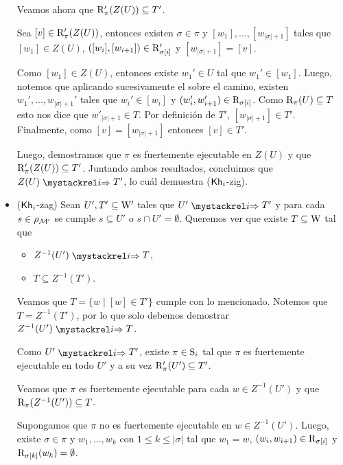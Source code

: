 \begin{demostracion}
\begin{itemize}
        Veamos ahora que $\R'_\pi(Z(U)) \subseteq T'$.

        Sea $[v] \in \R'_\pi(Z(U))$, entonces existen $\sigma \in \pi$ y $[w_1], ..., [w_{|\sigma|+1}]$ tales que 
        $[w_1] \in Z(U)$, $([w_i],[w_{i+1}]) \in \R'_{\sigma[i]}$ y $[w_{|\sigma|+1}] = [v]$.

        Como $[w_1] \in Z(U)$, entonces existe $w_1' \in U$ tal que $w_1'\in [w_1]$. Luego, notemos que aplicando sucesivamente el 
         sobre el camino, existen $w_1',...,w_{|\sigma|+1}'$ tales que $w_i' \in [w_i]$ y $(w_i',w_{i+1}')\in \R_{\sigma[i]}$. 
        Como $\R_\pi(U) \subseteq T$ esto nos dice que $w'_{|\sigma|+1} \in T$. Por definición de 
        $T'$, $[w_{|\sigma|+1}] \in T'$. Finalmente, como $[v] = [w_{|\sigma|+1}]$ entonces $[v] \in T'$.

        Luego, demostramos que $\pi$ es fuertemente ejecutable en $Z(U)$ y que $\R'_\pi(Z(U)) \subseteq T'$. 
        Juntando ambos resultados, concluimos que $Z(U) \ultsExecAgi T'$, lo cuál demuestra ($\khi$-zig).

       \item ($\khi$-zag) Sean $U', T' \subseteq \W'$ tales que $U' \ultsExecAgi T'$ y para cada $s \in \rho_{\modults'}$ se cumple $s \subseteq U'$ o 
        $s \cap U' = \emptyset$. Queremos ver que existe $T \subseteq \W$ tal que

       \begin{multicols}{2}
            \begin{itemize}
                \item $Z^{-1}(U') \ultsExecAgi T$, 
                \item $T \subseteq Z^{-1}(T')$.
            \end{itemize}
        \end{multicols}

        Veamos que $T = \{w \mid [w] \in T'\}$ cumple con lo mencionado. Notemos que $T = Z^{-1}(T')$, por lo que solo debemos demostrar 
        $Z^{-1}(U') \ultsExecAgi T$.

        Como $U' \ultsExecAgi T'$, existe $\pi \in \S_i$ tal que $\pi$ es fuertemente ejecutable en todo $U'$ y a su vez 
        $\R'_\pi(U') \subseteq T'$.

        Veamos que $\pi$ es fuertemente ejecutable para cada $w \in Z^{-1}(U')$ y que $\R_\pi(Z^{-1}(U')) \subseteq T$.

        Supongamos que $\pi$ no es fuertemente ejecutable en $w \in Z^{-1}(U')$. Luego, existe $\sigma \in \pi$ y $w_1,...,w_k$ con 
        $1 \le k \le |\sigma|$ tal que $w_1 = w$, $(w_i,w_{i+1}) \in \R_{\sigma[i]}$ y $\R_{\sigma[k]}(w_k) = \emptyset$. 


\end{itemize}
\end{demostracion}

